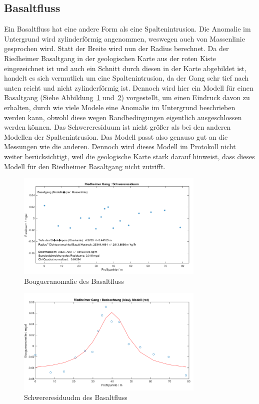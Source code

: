 \subsection{Basaltfluss}

Ein Basaltfluss hat eine andere Form als eine Spaltenintrusion. Die Anomalie im Untergrund wird zylinderförmig angenommen, weswegen auch von Massenlinie gesprochen wird. Statt der Breite wird nun der Radius berechnet. Da der Riedheimer Basaltgang in der geologischen Karte aus der roten Kiste eingezeichnet ist und auch ein Schnitt durch diesen in der Karte abgebildet ist, handelt es sich vermutlich um eine Spaltenintrusion, da der Gang sehr tief nach unten  reicht und nicht zylinderförmig ist. Dennoch wird hier ein Modell für einen Basaltgang (Siehe Abbildung~\ref{fig:modell3} und~\ref{fig:modell3_res}) vorgestellt, um einen Eindruck davon zu erhalten, durch wie viele Modele eine Anomalie im Untergrund beschrieben werden kann, obwohl diese wegen Randbedingungen eigentlich ausgeschlossen werden können. Das Schwereresiduum ist nicht größer als bei den anderen Modellen der Spaltenintrusion. Das Modell passt also genauso gut an die Messungen wie die anderen. Dennoch wird dieses Modell im Protokoll nicht weiter berücksichtigt, weil die geologische Karte stark darauf hinweist, dass dieses Modell für den Riedheimer Basaltgang nicht zutrifft.

\begin{figure}[!ht]
 \centering
 \includegraphics[width=0.8\textwidth]{fig/modell3}
 \caption{Bougueranomalie des Basaltfluss}
 \label{fig:modell3}
\end{figure}

\begin{figure}[!ht]
 \centering
 \includegraphics[width=0.8\textwidth]{fig/modell3_res}
 \caption{Schwereresiduudm des Basaltfluss}
 \label{fig:modell3_res}
\end{figure}

